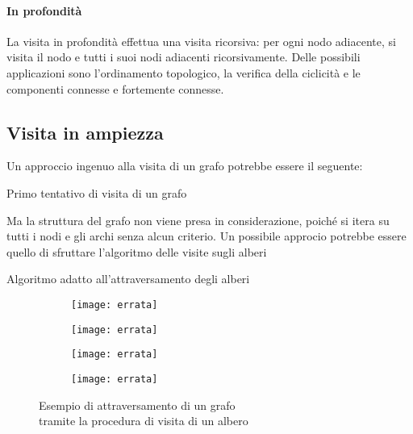 \paragraph{In profondità}
La visita in profondità effettua una visita ricorsiva: per ogni nodo adiacente, si visita il nodo e tutti i suoi nodi adiacenti ricorsivamente.
Delle possibili applicazioni sono l'ordinamento topologico, la verifica della ciclicità e le componenti connesse e fortemente connesse.

\subsection{Visita in ampiezza}

Un approccio ingenuo alla visita di un grafo potrebbe essere il seguente:

\begin{algorithm}[H]
	\caption{Primo tentativo di visita di un grafo}
\end{algorithm}

Ma la struttura del grafo non viene presa in considerazione, poiché si itera su tutti i nodi e gli archi senza alcun criterio.
Un possibile approcio potrebbe essere quello di sfruttare l'algoritmo delle visite sugli alberi

\begin{algorithm}[H]
	\caption[]{Algoritmo adatto all'attraversamento degli alberi}
	
\end{algorithm}

\clearpage
\begin{figure}[H]
	\centering

	\begin{subfigure}{.5\textwidth}
		\texttt{[image: errata]}
	\end{subfigure}\hfill
	\begin{subfigure}{.5\textwidth}
		\texttt{[image: errata]}
	\end{subfigure}

	\begin{subfigure}{.5\textwidth}
		\texttt{[image: errata]}
	\end{subfigure}\hfill
	\begin{subfigure}{.5\textwidth}
		\texttt{[image: errata]}
	\end{subfigure}

	\caption{Esempio di attraversamento di un grafo\\tramite la procedura di visita di un albero}
\end{figure}

